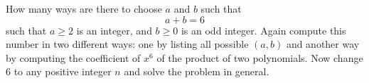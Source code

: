 How many ways are there to choose $a$ and $b$ such that
\[
a + b = 6
\]
such that $a \geq 2$ is an integer, and
$b \geq 0$ is an odd integer.
Again compute this number in two different ways:
one by listing all possible $(a, b)$ and another way by 
computing the coefficient of $x^6$ of the product
of two polynomials.
Now change 6 to any positive integer $n$ and solve the
problem in general.
